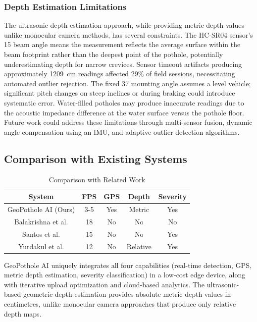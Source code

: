 \documentclass{ieeeaccess}
\begin{document}
\subsubsection{Depth Estimation Limitations}
The ultrasonic depth estimation approach, while providing metric depth values unlike monocular camera methods, has several constraints. The HC-SR04 sensor's 15\textdegree{} beam angle means the measurement reflects the average surface within the beam footprint rather than the deepest point of the pothole, potentially underestimating depth for narrow crevices. Sensor timeout artifacts producing approximately 1209~cm readings affected 29\% of field sessions, necessitating automated outlier rejection. The fixed 37\textdegree{} mounting angle assumes a level vehicle; significant pitch changes on steep inclines or during braking could introduce systematic error. Water-filled potholes may produce inaccurate readings due to the acoustic impedance difference at the water surface versus the pothole floor. Future work could address these limitations through multi-sensor fusion, dynamic angle compensation using an IMU, and adaptive outlier detection algorithms.

\subsection{Comparison with Existing Systems}
\begin{table}[h]
\caption{Comparison with Related Work}
\centering
\begin{tabular}{@{}ccccc@{}}
\toprule
\textbf{System} & \textbf{FPS} & \textbf{GPS} & \textbf{Depth} & \textbf{Severity} \\ \midrule
GeoPothole AI (Ours) & 3-5 & Yes & Metric & Yes \\
Balakrishna et al. \cite{b6} & 18 & No & No & No \\
Santos et al. \cite{b7} & 15 & No & No & Yes \\
Yurdakul et al. \cite{b3} & 12 & No & Relative & Yes \\ \bottomrule
\end{tabular}
\end{table}

GeoPothole AI uniquely integrates all four capabilities (real-time detection, GPS, metric depth estimation, severity classification) in a low-cost edge device, along with iterative upload optimization and cloud-based analytics. The ultrasonic-based geometric depth estimation provides absolute metric depth values in centimetres, unlike monocular camera approaches that produce only relative depth maps.
\end{document}
